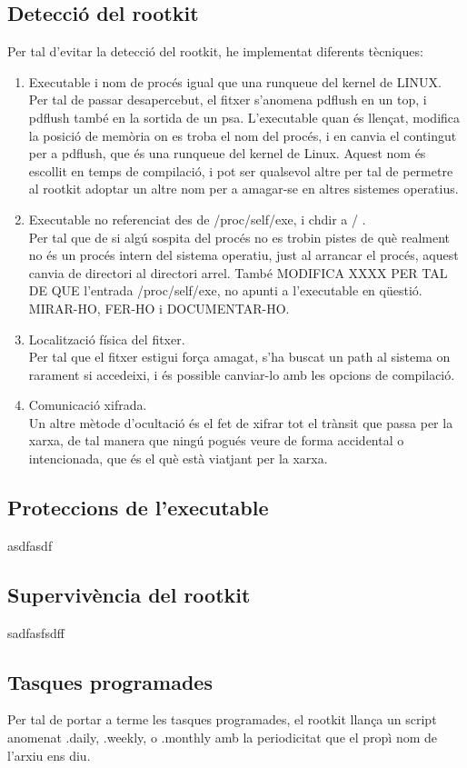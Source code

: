 \subsection{Detecció del rootkit}
Per tal d'evitar la detecció del rootkit, he implementat diferents tècniques:
\begin{enumerate}
\item Executable i nom de procés igual que una runqueue del kernel de LINUX. \\
Per tal de passar desapercebut, el fitxer s'anomena pdflush en un top, i
pdflush també en la sortida de un psa. L'executable quan és llençat, modifica la posició de memòria on es troba el nom del procés, i en canvia el contingut
per a pdflush, que és una runqueue del kernel de Linux. Aquest nom és escollit en temps de compilació, i pot ser qualsevol altre per tal de permetre al
rootkit adoptar un altre nom per a amagar-se en altres sistemes operatius.
\item Executable no referenciat des de /proc/self/exe, i chdir a / . \\
Per tal que de si algú sospita del procés no es trobin pistes de què realment no és un procés intern del sistema operatiu, just al arrancar el procés,
aquest canvia de directori al directori arrel. També MODIFICA XXXX PER TAL DE QUE l'entrada /proc/self/exe, no apunti a l'executable en qüestió. MIRAR-HO, 
FER-HO i DOCUMENTAR-HO.
\item Localització física del fitxer. \\
Per tal que el fitxer estigui força amagat, s'ha  buscat un path al sistema on rarament si accedeixi, i és possible canviar-lo amb les opcions de compilació.
\item Comunicació xifrada. \\
Un altre mètode d'ocultació és el fet de xifrar tot el trànsit que passa per la xarxa, de tal manera que ningú pogués veure de forma accidental o 
intencionada, que és el què està viatjant per la xarxa.
\end{enumerate} 

\subsection{Proteccions de l'executable}
asdfasdf
\subsection{Supervivència del rootkit}
sadfasfsdff

\subsection{Tasques programades}
Per tal de portar a terme les tasques programades, el rootkit llança un script anomenat .daily, .weekly, o .monthly amb la periodicitat que el propì
nom de l'arxiu ens diu. 


